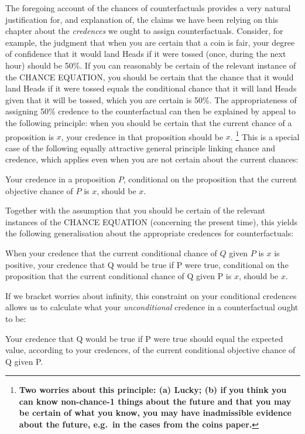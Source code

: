 \documentclass[leqno, 11pt, a5paper, openany]{article}
\begin{document}
The foregoing account of the chances of counterfactuals provides a very natural justification for, and explanation of, the claims we have been relying on this chapter about the \emph{credences} we ought to assign counterfactuals. Consider, for example, the judgment that when you are certain that a coin is fair, your degree of confidence that it would land Heads if it were tossed (once, during the next hour) should be 50\%. If you can reasonably be certain of the relevant instance of the CHANCE EQUATION, you should be certain that the chance that it would land Heads if it were tossed equals the conditional chance that it will land Heads given that it will be tossed, which you are certain is 50\%. The appropriateness of assigning 50\% credence to the counterfactual can then be explained by appeal to the following principle: when you should be certain that the current chance of a proposition is $x$, your credence in that proposition should be $x$.%
\footnote{\textbf{Two worries about this principle: (a) Lucky; (b) if you think you can know non-chance-1 things about the future and that you may be certain of what you know, you may have inadmissible evidence about the future, e.g.~in the cases from the coins paper.}} 
This is a special case of the following equally attractive general principle linking chance and credence, which applies even when you are not certain about the current chances:
\begin{prop}
	 \label{currentpp}
	Your credence in a proposition $P$, conditional on the proposition that the current objective chance of $P$ is $x$, should be $x$.
\end{prop}
Together with the assumption that you should be certain of the relevant
instances of the CHANCE EQUATION (concerning the present time), this
yields the following generalisation about the appropriate credences for
counterfactuals:
\begin{prop}
	 \label{currentskyrms}
	When your credence that the current conditional chance of $Q$ given $P$ is $x$ is positive, your credence that Q would be true if P were true, conditional on the proposition that the current conditional chance of Q given P is $x$, should be $x$. 
\end{prop}
If we bracket worries about infinity, this constraint on your
conditional credences allows us to calculate what your
\emph{unconditional} credence in a counterfactual ought to be:
\begin{prop}
	\item
	Your credence that Q would be true if P were true should equal the expected value, according to your credences, of the current conditional objective chance of Q given P.
\end{prop}
\end{document}
